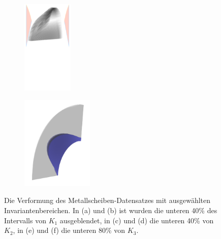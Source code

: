 \documentclass[a4paper,fontsize=12pt,toc=bib,parskip=half,ngerman]{scrartcl}
\begin{document}
\begin{figure}
\begin{subfigure}{0.49\textwidth}
		\subcaption{}
		\label{MetalDiskStrainObject2}
	\end{subfigure}
	\medskip
	\begin{subfigure}{0.49\textwidth}
		\centering
		\includegraphics[height=4.5cm]{pictures/results/MetalDisk/strain/cylindrical/MetalDiskStrain_InvariantSpace3.png}
		\subcaption{}
		\label{MetalDiskStrainInvariant3}
	\end{subfigure}
	\hspace*{\fill}
	\begin{subfigure}{0.49\textwidth}
		\centering
		\includegraphics[height=4.5cm]{pictures/results/MetalDisk/strain/MetalDiskStrain_Object3.png}
		\subcaption{}
		\label{MetalDiskStrainObject3}
	\end{subfigure}
	\caption{Die Verformung des Metallscheiben-Datensatzes mit ausgew\"ahlten Invariantenbereichen. In (a) und (b) ist wurden die unteren 40\% des Intervalls von $K_1$ ausgeblendet, in (c) und (d) die unteren 40\% von $K_2$, in (e) und (f) die unteren 80\% von $K_3$.}
	\label{MetalDiskStrainInteraction}
\end{figure}
\end{document}
